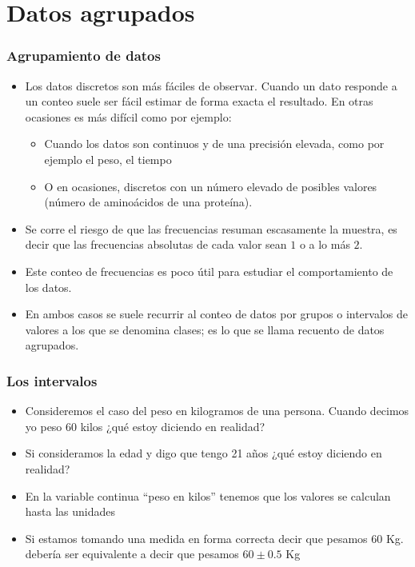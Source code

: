 \section{Datos agrupados}
\begin{frame}
 \frametitle{Agrupamiento de datos}
\begin{itemize}
\item Los datos discretos son más fáciles de observar. Cuando un dato responde a un conteo  suele ser fácil estimar de forma exacta el resultado. En otras ocasiones  es más difícil como por  ejemplo:
\begin{itemize}
\item Cuando los datos son continuos y de una precisión elevada, como por ejemplo el peso, el tiempo
\item O en ocasiones, discretos con un número elevado de posibles valores
 (número de aminoácidos de una proteína).
\end{itemize}
\item Se corre el riesgo de que las frecuencias resuman escasamente la muestra, es decir que las
frecuencias absolutas de cada valor sean $1$ o  a lo más $2$.
\item Este conteo de frecuencias es poco útil para estudiar el comportamiento de los datos.
\item  En ambos casos se suele recurrir al conteo de datos por grupos o intervalos de valores a los que se denomina
clases; es lo que se llama recuento de datos agrupados.
\end{itemize}
\end{frame}
\begin{frame}

\frametitle{Los intervalos}
\begin{itemize}
\item Consideremos el caso del peso en kilogramos de una persona. Cuando decimos yo peso 60
kilos ¿qué estoy diciendo en realidad? 
\item Si consideramos la edad y digo que tengo 21 años
¿qué estoy diciendo en realidad?
\item En la variable continua ``peso en kilos'' tenemos que los
valores se calculan hasta las unidades
\item  Si estamos tomando una medida en forma correcta
decir que pesamos 60 Kg. debería ser equivalente a decir que pesamos $60\pm 0.5$ Kg
\end{itemize}
\end{frame}

